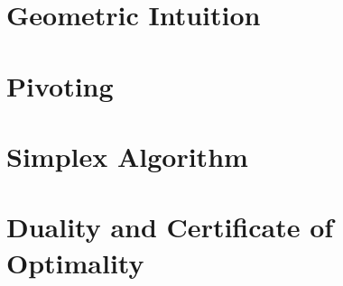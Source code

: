 \section{Geometric Intuition}

\section{Pivoting}

\section{Simplex Algorithm}

\section{Duality and Certificate of Optimality}